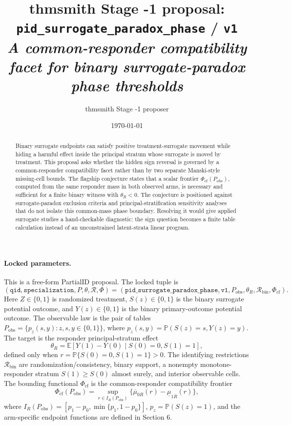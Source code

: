 \documentclass[11pt]{article}
\title{thmsmith Stage -1 proposal: \texttt{pid\_surrogate\_paradox\_phase} / \texttt{v1}%
  \\ \large\textit{A common-responder compatibility facet for binary surrogate-paradox phase thresholds}}
\author{thmsmith Stage -1 proposer}
\date{\today}
\newcommand{\E}{\mathbb{E}}
\renewcommand{\Pr}{\mathbb{P}}
\theoremstyle{definition}
\theoremstyle{plain}
\theoremstyle{remark}
\begin{document}
\maketitle


\paragraph{Locked parameters.}
This is a free-form PartialID proposal. The locked tuple is
\[
(\texttt{qid},\texttt{specialization},P,\theta,\mathcal R,\Phi)
=
(\texttt{pid\_surrogate\_paradox\_phase},\texttt{v1},P_{\mathrm{obs}},
\theta_R,\mathcal R_{\mathrm{bin}},\Phi_{\mathrm{cf}}).
\]
Here \(Z\in\{0,1\}\) is randomized treatment, \(S(z)\in\{0,1\}\) is the binary surrogate potential outcome, and \(Y(z)\in\{0,1\}\) is the binary primary-outcome potential outcome. The observable law is the pair of tables \(P_{\mathrm{obs}}=\{p_z(s,y):z,s,y\in\{0,1\}\}\), where \(p_z(s,y)=\Pr(S(z)=s,Y(z)=y)\). The target is the responder principal-stratum effect
\[
  \theta_R=\E[Y(1)-Y(0)\mid S(0)=0,S(1)=1],
\]
defined only when \(r=\Pr\{S(0)=0,S(1)=1\}>0\). The identifying restrictions \(\mathcal R_{\mathrm{bin}}\) are randomization/consistency, binary support, a nonempty monotone-responder stratum \(S(1)\ge S(0)\) almost surely, and interior observable cells. The bounding functional \(\Phi_{\mathrm{cf}}\) is the common-responder compatibility frontier
\[
  \Phi_{\mathrm{cf}}(P_{\mathrm{obs}})=
  \sup_{r\in I_R(P_{\mathrm{obs}})}
  \{\overline\mu_{0R}(r)-\underline\mu_{1R}(r)\},
\]
where \(I_R(P_{\mathrm{obs}})=[p_1-p_0,\min\{p_1,1-p_0\}]\), \(p_z=\Pr(S(z)=1)\), and the arm-specific endpoint functions are defined in Section 6.

\begin{abstract}
Binary surrogate endpoints can satisfy positive treatment-surrogate movement while hiding a harmful effect inside the principal stratum whose surrogate is moved by treatment. This proposal asks whether the hidden sign reversal is governed by a common-responder compatibility facet rather than by two separate Manski-style missing-cell bounds. The flagship conjecture states that a scalar frontier \(\Phi_{\mathrm{cf}}(P_{\mathrm{obs}})\), computed from the same responder mass in both observed arms, is necessary and sufficient for a finite binary witness with \(\theta_R<0\). The conjecture is positioned against surrogate-paradox exclusion criteria and principal-stratification sensitivity analyses that do not isolate this common-mass phase boundary. Resolving it would give applied surrogate studies a hand-checkable diagnostic: the sign question becomes a finite table calculation instead of an unconstrained latent-strata linear program.
\end{abstract}
\end{document}

